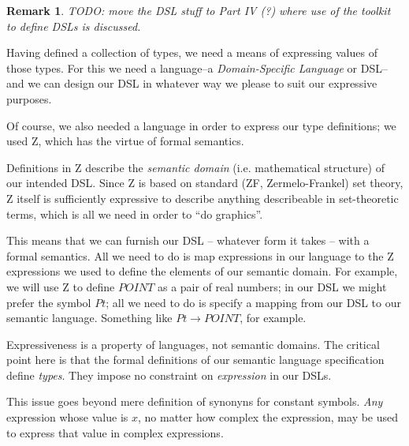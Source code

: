 \documentclass[12pt]{tufte-handout}
\numberwithin{equation}{subsection}
\numberwithin{equation}{subsection}
\newtheorem{remark}{Remark}
\begin{document}
\begin{remark}
  TODO: move the DSL stuff to Part IV (?) where use of the toolkit to
  define DSLs is discussed.
\end{remark}

Having defined a collection of types, we need a means of expressing
values of those types.  For this we need a language--a
\textit{Domain-Specific Language} or DSL--and we can design our DSL in
whatever way we please to suit our expressive purposes.

Of course, we also needed a language in order to express our type
definitions; we used Z, which has the virtue of formal semantics.

Definitions in Z describe the \textit{semantic domain}
(i.e. mathematical structure) of our intended DSL.  Since Z is based
on standard (ZF, Zermelo-Frankel) set theory, Z itself is sufficiently
expressive to describe anything describeable in set-theoretic terms,
which is all we need in order to ``do graphics''.

This means that we can furnish our DSL -- whatever form it takes --
with a formal semantics.  All we need to do is map expressions in our
language to the Z expressions we used to define the elements of our
semantic domain.  For example, we will use Z to define \(POINT\) as a
pair of real numbers; in our DSL we might prefer the symbol \(Pt\);
all we need to do is specify a mapping from our DSL to our semantic
language. Something like \(Pt\rightarrow POINT\), for
example.

Expressiveness is a property of languages, not semantic domains.  The
critical point here is that the formal definitions of our semantic
language specification define \textit{types}.  They impose no
constraint on \textit{expression} in our DSLs.

This issue goes beyond mere definition of synonyns for constant
symbols.  \textit{Any} expression whose value is \(x\), no matter how
complex the expression, may be used to express that value in complex
expressions.

\end{document}
